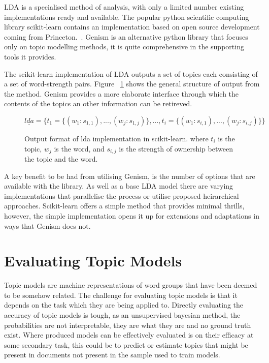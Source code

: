 \documentclass[10pt]{report}
\begin{document}
LDA is a specialised method of analysis, with only a limited number existing implementations ready and available. The popular python scientific computing library scikit-learn contains an implementation based on open source development coming from Princeton.~\cite{?}. Genism is an alternative python library that focuses only on topic modelling methods, it is quite comprehensive in the supporting tools it provides.~\cite{rehurek_lrec}

The scikit-learn implementation of LDA outputs a set of topics each consisting of a set of word-strength pairs. Figure ~\ref{fig:lda_sklearn_output} shows the general structure of output from the method. Genism provides a more elaborate interface through which the contents of the topics an other information can be retireved. 
\begin{figure}[h!]
\[
  \underline{lda} = \{t_1 = \{(w_1 : s_{1,1}), ..., (w_j : s_{1,j})\}, ..., t_i =\{(w_1 : s_{i,1}), ..., (w_j : s_{i,j})\}\}
\]
\caption{Output format of lda implementation in scikit-learn. where \(t_i\) is the topic, \(w_j\) is the word, and \(s_{i,j}\) is the strength of ownership between the topic and the word. \label{fig:lda_sklearn_output}}
\end{figure}

A key benefit to be had from utilising Genism, is the number of options that are available with the library. As well as a base LDA model there are varying implementations that parallelise the process or utilise proposed heirarchical approaches. Scikit-learn offers a simple method that provides minimal thrills, however, the simple implementation opens it up for extensions and adaptations in ways that Genism does not.

\section{Evaluating Topic Models}
Topic models are machine representations of word groups that have been deemed to be somehow related. The challenge for evaluating topic models is that it depends on the task which they are being applied to. Directly evaluating the accuracy of topic models is tough, as an unsupervised bayesian method, the probabilities are not interpretable, they are what they are and no ground truth exist. Where produced models can be effectively evaluated is on their efficacy at some secondary task, this could be to predict or estimate topics that might be present in documents not present in the sample used to train models.
\end{document}
